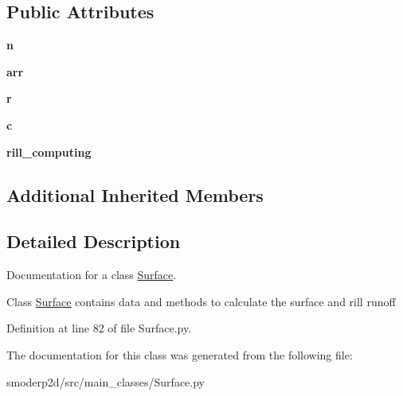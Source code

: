 \subsection*{Public Attributes}
\begin{DoxyCompactItemize}
\item 
\hypertarget{classsmoderp2d_1_1src_1_1main__classes_1_1Surface_1_1Surface_aa7c6b79c82e4fdc3c10618352f6f8a95}{{\bfseries n}}\label{classsmoderp2d_1_1src_1_1main__classes_1_1Surface_1_1Surface_aa7c6b79c82e4fdc3c10618352f6f8a95}

\item 
\hypertarget{classsmoderp2d_1_1src_1_1main__classes_1_1Surface_1_1Surface_a7e6c8ba706c0e4a66c5cf9c6411d97f5}{{\bfseries arr}}\label{classsmoderp2d_1_1src_1_1main__classes_1_1Surface_1_1Surface_a7e6c8ba706c0e4a66c5cf9c6411d97f5}

\item 
\hypertarget{classsmoderp2d_1_1src_1_1main__classes_1_1Surface_1_1Surface_a65f67746247e945119a01f15d10cf78c}{{\bfseries r}}\label{classsmoderp2d_1_1src_1_1main__classes_1_1Surface_1_1Surface_a65f67746247e945119a01f15d10cf78c}

\item 
\hypertarget{classsmoderp2d_1_1src_1_1main__classes_1_1Surface_1_1Surface_a6af217c6e409f4f36839b469c70e537f}{{\bfseries c}}\label{classsmoderp2d_1_1src_1_1main__classes_1_1Surface_1_1Surface_a6af217c6e409f4f36839b469c70e537f}

\item 
\hypertarget{classsmoderp2d_1_1src_1_1main__classes_1_1Surface_1_1Surface_a582cc99afa50aa905ee83b83e88f1300}{{\bfseries rill\-\_\-computing}}\label{classsmoderp2d_1_1src_1_1main__classes_1_1Surface_1_1Surface_a582cc99afa50aa905ee83b83e88f1300}

\end{DoxyCompactItemize}
\subsection*{Additional Inherited Members}


\subsection{Detailed Description}
Documentation for a class \hyperlink{classsmoderp2d_1_1src_1_1main__classes_1_1Surface_1_1Surface}{Surface}. 

Class \hyperlink{classsmoderp2d_1_1src_1_1main__classes_1_1Surface_1_1Surface}{Surface} contains data and methods to calculate the surface and rill runoff 

Definition at line 82 of file Surface.\-py.



The documentation for this class was generated from the following file\-:\begin{DoxyCompactItemize}
\item 
smoderp2d/src/main\-\_\-classes/Surface.\-py\end{DoxyCompactItemize}
